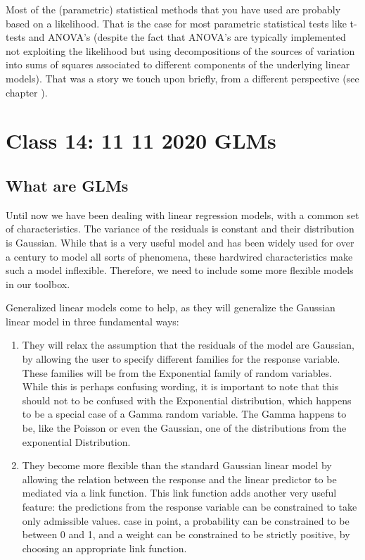\documentclass[
]{book}
\begin{document}
Most of the (parametric) statistical methods that you have used are probably based on a likelihood. That is the case for most parametric statistical tests like t-tests and ANOVA's (despite the fact that ANOVA's are typically implemented not exploiting the likelihood but using decompositions of the sources of variation into sums of squares associated to different components of the underlying linear models). That was a story we touch upon briefly, from a different perspective (see chapter ).

\hypertarget{aula14}{%
\chapter{Class 14: 11 11 2020 GLMs}\label{aula14}}

\hypertarget{what-are-glms}{%
\section{What are GLMs}\label{what-are-glms}}

Until now we have been dealing with linear regression models, with a common set of characteristics. The variance of the residuals is constant and their distribution is Gaussian. While that is a very useful model and has been widely used for over a century to model all sorts of phenomena, these hardwired characteristics make such a model inflexible. Therefore, we need to include some more flexible models in our toolbox.

Generalized linear models come to help, as they will generalize the Gaussian linear model in three fundamental ways:

\begin{enumerate}
\def\labelenumi{\arabic{enumi}.}
\item
  They will relax the assumption that the residuals of the model are Gaussian, by allowing the user to specify different families for the response variable. These families will be from the Exponential family of random variables. While this is perhaps confusing wording, it is important to note that this should not to be confused with the Exponential distribution, which happens to be a special case of a Gamma random variable. The Gamma happens to be, like the Poisson or even the Gaussian, one of the distributions from the exponential Distribution.
\item
  They become more flexible than the standard Gaussian linear model by allowing the relation between the response and the linear predictor to be mediated via a link function. This link function adds another very useful feature: the predictions from the response variable can be constrained to take only admissible values. case in point, a probability can be constrained to be between 0 and 1, and a weight can be constrained to be strictly positive, by choosing an appropriate link function.
\end{enumerate}
\end{document}
